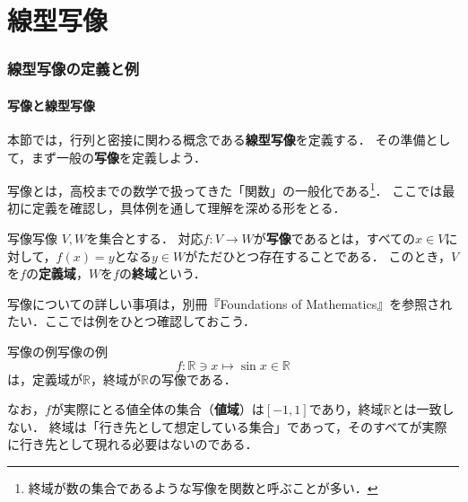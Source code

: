 \part{線型写像}

\begin{abstract}
  和とスカラー倍を保つ写像として\textbf{線型写像}を定義し，幾何的な変換や微分などの例を見る．
  次に，線型写像と行列が一対一に対応することを示し，最後に像と核を導入する．
\end{abstract}

\section{線型写像の定義と例}

\subsection{写像と線型写像}

本節では，行列と密接に関わる概念である\textbf{線型写像}を定義する．
その準備として，まず一般の\textbf{写像}を定義しよう．

写像とは，高校までの数学で扱ってきた「関数」の一般化である\footnote{終域が数の集合であるような写像を関数と呼ぶことが多い．}．
ここでは最初に定義を確認し，具体例を通して理解を深める形をとる．

\begin{definition}{写像}{写像}
  $V,W$を集合とする．
  対応$f \colon V \to W$が\textbf{写像}であるとは，すべての$x \in V$に対して，$f(x) = y$となる$y \in W$がただひとつ存在することである．
  このとき，$V$を$f$の\textbf{定義域}，$W$を$f$の\textbf{終域}という．
\end{definition}

写像についての詳しい事項は，別冊『Foundations of Mathematics』を参照されたい．ここでは例をひとつ確認しておこう．

\begin{example}{写像の例}{写像の例}
  \[
   f\colon \mathbb{R} \ni x \mapsto \sin x \in \mathbb{R}
  \]
  は，定義域が$\mathbb{R}$，終域が$\mathbb{R}$の写像である．

  なお，$f$が実際にとる値全体の集合（\textbf{値域}）は$[-1, 1]$であり，終域$\mathbb{R}$とは一致しない．
  終域は「行き先として想定している集合」であって，そのすべてが実際に行き先として現れる必要はないのである．
\end{example}

